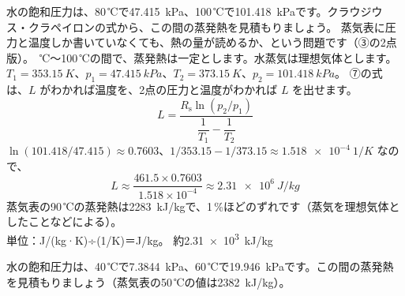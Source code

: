 \label{ph:熱-10:ex2}
\begin{phreidai}
水の飽和圧力は、80\,℃で\qty{47.415}{kPa}、100\,℃で\qty{101.418}{kPa}です。クラウジウス・クラペイロンの式から、この間の蒸発熱を見積もりましょう。
\phbamen
蒸気表に圧力と温度しか書いていなくても、熱の量が読めるか、という問題です（③の2点版）。
\,℃〜100\,℃の間で、蒸発熱は一定とします。水蒸気は理想気体とします。
\phzu
$T_1=\qty{353.15}{K}$、$p_1=\qty{47.415}{kPa}$、$T_2=\qty{373.15}{K}$、$p_2=\qty{101.418}{kPa}$。
\phriyu
⑦の式は、$L$ がわかれば温度を、2点の圧力と温度がわかれば $L$ を出せます。
\phtateru
\[L=\frac{R_{\mathrm s}\ln(p_2/p_1)}{\dfrac{1}{T_1}-\dfrac{1}{T_2}}\]
\phtoku
$\ln(101.418/47.415)\approx0.7603$、$1/353.15-1/373.15\approx\qty{1.518e-4}{1/K}$ なので、
\[L\approx\frac{461.5\times0.7603}{1.518\times10^{-4}}\approx\qty{2.31e6}{J/kg}\]
\phtashikame
蒸気表の90\,℃の蒸発熱は\qty{2283}{kJ/kg}で、1\,\%ほどのずれです（蒸気を理想気体としたことなどによる）。\\
単位：J/(kg·K)÷(1/K)＝J/kg。
\kotae 約\qty{2.31e3}{kJ/kg}
\end{phreidai}
\begin{jibun}
水の飽和圧力は、40\,℃で\qty{7.3844}{kPa}、60\,℃で\qty{19.946}{kPa}です。この間の蒸発熱を見積もりましょう（蒸気表の50\,℃の値は\qty{2382}{kJ/kg}）。
\end{jibun}


